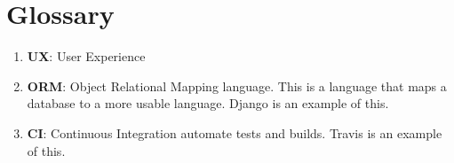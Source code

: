 \documentclass{article}
\begin{document}
\section{Glossary}

\begin{enumerate}
    \item \textbf{UX}: User Experience
    \item \textbf{ORM}: Object Relational Mapping language. This is a language that maps a database to a more usable language. Django is an example of this.
    \item \textbf{CI}: Continuous Integration automate tests and builds. Travis is an example of this.
\end{enumerate}
\end{document}
